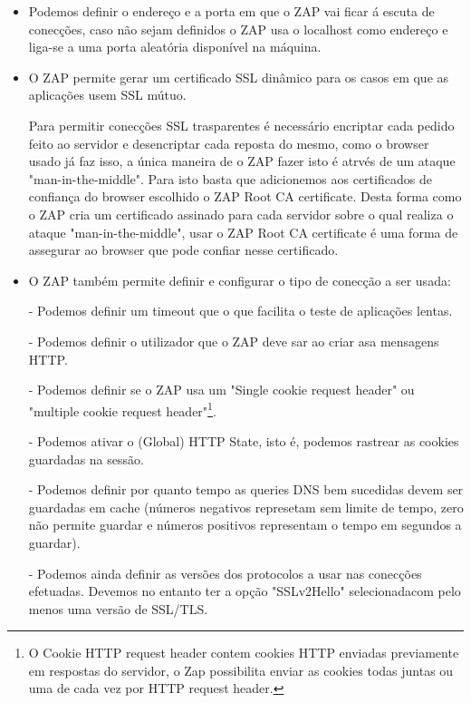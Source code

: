 \begin{itemize}
\begin{itemize}
\item Podemos definir o endereço e a porta em que o ZAP vai ficar á escuta de conecções, caso não sejam definidos o ZAP usa o localhost como endereço e liga-se a uma porta aleatória disponível na máquina. 

\item O ZAP permite gerar um certificado SSL dinâmico para os casos em que as aplicações usem SSL mútuo.\newline
\par Para permitir conecções SSL trasparentes é necessário encriptar cada pedido feito ao servidor e desencriptar cada reposta do mesmo, como o browser usado já faz isso, a única maneira de o ZAP fazer isto é atrvés de um ataque "man-in-the-middle". Para isto basta que adicionemos aos certificados de confiança do browser escolhido o ZAP Root CA certificate. Desta forma como o ZAP cria um certificado assinado para cada servidor sobre o qual realiza o ataque "man-in-the-middle", usar o ZAP Root CA certificate é uma forma de assegurar ao browser que pode confiar nesse certificado.

\item O ZAP também permite definir e configurar o tipo de conecção a ser usada:

\par - Podemos definir um timeout que o que facilita o teste de aplicações lentas.\newline
\par - Podemos definir o utilizador que o ZAP deve sar ao criar asa mensagens HTTP.\newline
\par - Podemos definir se o ZAP usa um "Single cookie request header" ou "multiple cookie request header"\footnote[3]{O Cookie HTTP request header contem cookies HTTP enviadas previamente em respostas do servidor, o Zap possibilita enviar as cookies todas juntas ou uma de cada vez por HTTP request header.}.\newline
\par - Podemos ativar o (Global) HTTP State, isto é, podemos rastrear as cookies guardadas na sessão.\newline
\par - Podemos definir por quanto tempo as queries DNS bem sucedidas devem ser guardadas em cache (números negativos represetam sem limite de tempo, zero não permite guardar e números positivos representam o tempo em segundos a guardar).\newline
\par - Podemos ainda definir as versões dos protocolos a usar nas conecções efetuadas. Devemos no entanto ter a opção "SSLv2Hello" selecionadacom pelo menos uma versão de SSL/TLS. \newline



\end{itemize}
\end{itemize}
